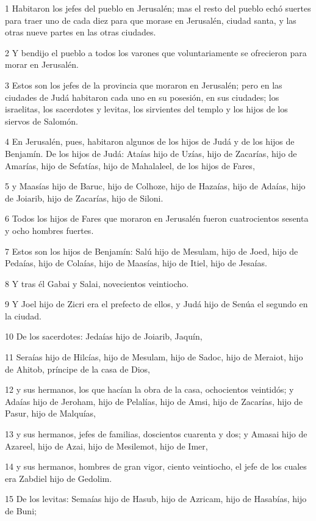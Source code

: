 \par 1 Habitaron los jefes del pueblo en Jerusalén; mas el resto del pueblo echó suertes para traer uno de cada diez para que morase en Jerusalén, ciudad santa, y las otras nueve partes en las otras ciudades.
\par 2 Y bendijo el pueblo a todos los varones que voluntariamente se ofrecieron para morar en Jerusalén.
\par 3 Estos son los jefes de la provincia que moraron en Jerusalén; pero en las ciudades de Judá habitaron cada uno en su posesión, en sus ciudades; los israelitas, los sacerdotes y levitas, los sirvientes del templo y los hijos de los siervos de Salomón.
\par 4 En Jerusalén, pues, habitaron algunos de los hijos de Judá y de los hijos de Benjamín. De los hijos de Judá: Ataías hijo de Uzías, hijo de Zacarías, hijo de Amarías, hijo de Sefatías, hijo de Mahalaleel, de los hijos de Fares,
\par 5 y Maasías hijo de Baruc, hijo de Colhoze, hijo de Hazaías, hijo de Adaías, hijo de Joiarib, hijo de Zacarías, hijo de Siloni.
\par 6 Todos los hijos de Fares que moraron en Jerusalén fueron cuatrocientos sesenta y ocho hombres fuertes.
\par 7 Estos son los hijos de Benjamín: Salú hijo de Mesulam, hijo de Joed, hijo de Pedaías, hijo de Colaías, hijo de Maasías, hijo de Itiel, hijo de Jesaías.
\par 8 Y tras él Gabai y Salai, novecientos veintiocho.
\par 9 Y Joel hijo de Zicri era el prefecto de ellos, y Judá hijo de Senúa el segundo en la ciudad.
\par 10 De los sacerdotes: Jedaías hijo de Joiarib, Jaquín,
\par 11 Seraías hijo de Hilcías, hijo de Mesulam, hijo de Sadoc, hijo de Meraiot, hijo de Ahitob, príncipe de la casa de Dios,
\par 12 y sus hermanos, los que hacían la obra de la casa, ochocientos veintidós; y Adaías hijo de Jeroham, hijo de Pelalías, hijo de Amsi, hijo de Zacarías, hijo de Pasur, hijo de Malquías,
\par 13 y sus hermanos, jefes de familias, doscientos cuarenta y dos; y Amasai hijo de Azareel, hijo de Azai, hijo de Mesilemot, hijo de Imer,
\par 14 y sus hermanos, hombres de gran vigor, ciento veintiocho, el jefe de los cuales era Zabdiel hijo de Gedolim.
\par 15 De los levitas: Semaías hijo de Hasub, hijo de Azricam, hijo de Hasabías, hijo de Buni;
